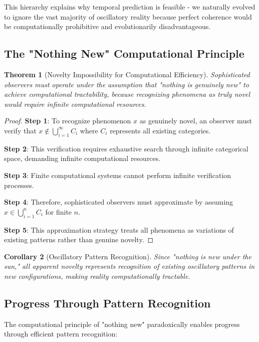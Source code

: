 \documentclass[11pt]{article}
\newtheorem{theorem}{Theorem}[section]
\newtheorem{corollary}[theorem]{Corollary}
\theoremstyle{remark}
\begin{document}
This hierarchy explains why temporal prediction is feasible - we naturally evolved to ignore the vast majority of oscillatory reality because perfect coherence would be computationally prohibitive and evolutionarily disadvantageous.

\subsection{The "Nothing New" Computational Principle}

\begin{theorem}[Novelty Impossibility for Computational Efficiency]
Sophisticated observers must operate under the assumption that "nothing is genuinely new" to achieve computational tractability, because recognizing phenomena as truly novel would require infinite computational resources.
\end{theorem}

\begin{proof}
\textbf{Step 1}: To recognize phenomenon $x$ as genuinely novel, an observer must verify that $x \notin \bigcup_{i=1}^{\infty} C_i$ where $C_i$ represents all existing categories.

\textbf{Step 2}: This verification requires exhaustive search through infinite categorical space, demanding infinite computational resources.

\textbf{Step 3}: Finite computational systems cannot perform infinite verification processes.

\textbf{Step 4}: Therefore, sophisticated observers must approximate by assuming $x \in \bigcup_{i=1}^{n} C_i$ for finite $n$.

\textbf{Step 5}: This approximation strategy treats all phenomena as variations of existing patterns rather than genuine novelty.
\end{proof}

\begin{corollary}[Oscillatory Pattern Recognition]
Since "nothing is new under the sun," all apparent novelty represents recognition of existing oscillatory patterns in new configurations, making reality computationally tractable.
\end{corollary}

\subsection{Progress Through Pattern Recognition}

The computational principle of "nothing new" paradoxically enables progress through efficient pattern recognition:
\end{document}
